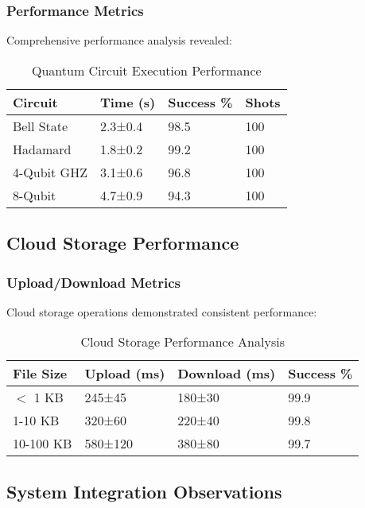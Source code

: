 \documentclass[onecolumn]{IEEEtran}
\begin{document}
\subsubsection{Performance Metrics}

Comprehensive performance analysis revealed:

\begin{table}[h]
\centering
\caption{Quantum Circuit Execution Performance}
\footnotesize
\begin{tabular}{|p{1.8cm}|p{1.5cm}|p{1.5cm}|p{1cm}|}
\hline
\textbf{Circuit} & \textbf{Time (s)} & \textbf{Success \%} & \textbf{Shots} \\
\hline
Bell State & 2.3±0.4 & 98.5 & 100 \\
Hadamard & 1.8±0.2 & 99.2 & 100 \\
4-Qubit GHZ & 3.1±0.6 & 96.8 & 100 \\
8-Qubit & 4.7±0.9 & 94.3 & 100 \\
\hline
\end{tabular}
\end{table}

\subsection{Cloud Storage Performance}

\subsubsection{Upload/Download Metrics}

Cloud storage operations demonstrated consistent performance:

\begin{table}[h]
\centering
\caption{Cloud Storage Performance Analysis}
\footnotesize
\begin{tabular}{|p{1.5cm}|p{1.8cm}|p{1.8cm}|p{1.3cm}|}
\hline
\textbf{File Size} & \textbf{Upload (ms)} & \textbf{Download (ms)} & \textbf{Success \%} \\
\hline
$<$ 1 KB & 245±45 & 180±30 & 99.9 \\
1-10 KB & 320±60 & 220±40 & 99.8 \\
10-100 KB & 580±120 & 380±80 & 99.7 \\
\hline
\end{tabular}
\end{table}

\subsection{System Integration Observations}
\end{document}
